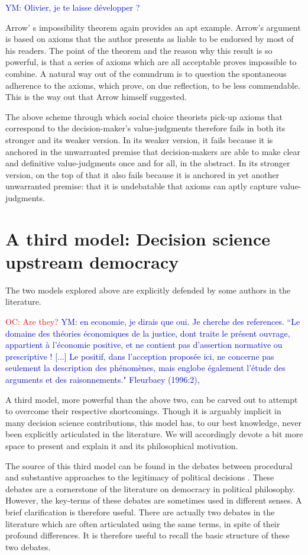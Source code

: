 \documentclass[preprint,11pt]{elsarticle}
\newcommand{\commentYM}[1]{\textcolor{blue}{YM: #1}}
\newcommand{\commentOC}[1]{\textcolor{red}{OC: #1}}
\begin{document}
\commentYM{Olivier, je te laisse développer ?}

Arrow' s  impossibility theorem \cite{arrow_social_2012} again provides an apt example. Arrow's argument is based on axioms that the author presents as liable to be endorsed by most of his readers. The point of the theorem and the reason why this result is so powerful, is that a series of axioms which are all acceptable proves impossible to combine. A natural way out of the conundrum is to question the spontaneous adherence to the axioms, which prove, on due reflection, to be less commendable. This is the way out that Arrow himself suggested.


The above scheme through which social choice theorists pick-up axioms that correspond to the decision-maker's value-judgments therefore fails in both its stronger and its weaker version. In its weaker version, it fails because it is anchored in the unwarranted premise that decision-makers are able to make clear and definitive value-judgments once and for all, in the abstract. In its stronger version, on the top of that it also fails because it is anchored in yet another unwarranted premise: that it is undebatable that axioms can aptly capture value-judgments.

\section{A third model: Decision science upstream democracy}
\noindent The two models explored above are explicitly defended by some authors in the literature. 

\commentOC{ Are they?}
\commentYM{en economie, je dirais que oui. Je cherche des references.
“Le domaine des théories économiques de la justice, dont traite le présent ouvrage, appartient
à l’économie positive, et ne contient pas d’assertion normative ou prescriptive ! [...] Le positif,
dans l’acception proposée ici, ne concerne pas seulement la description des phénomènes, mais englobe
également l’étude des arguments et des raisonnements." Fleurbaey (1996:2),} 

A third model, more powerful than the above two, can be carved out to attempt to overcome their respective shortcomings. Though it is arguably implicit in many decision science contributions, this model has, to our best knowledge, never been explicitly articulated in the literature. We will accordingly devote a bit more space to present and explain it and its philosophical motivation.

The source of this third model can be found in the debates between procedural and substantive approaches to the legitimacy of political decisions \cite{meinard_what_2017}. These debates are a cornerstone of the literature on democracy in political philosophy. However, the key-terms of these debates are sometimes used in different senses. A brief clarification is therefore useful. There are actually two debates in the literature which are often articulated using the same terms, in spite of their profound differences. It is therefore useful to recall the basic structure of these two debates.
\end{document}
